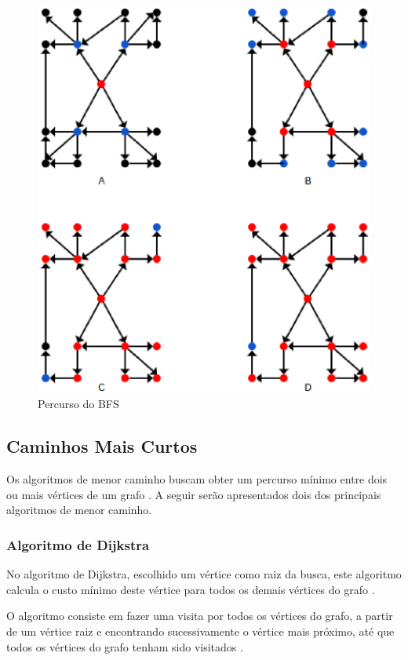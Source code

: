 \begin{figure}[!h]
	\centering
	\includegraphics[scale=0.5]{figuras/capitulo2/bfs.eps}
	\caption{Percurso do BFS}
	\label{bfs}
\end{figure}

\subsection{Caminhos Mais Curtos}

Os algoritmos de menor caminho buscam obter um percurso mínimo entre dois ou mais vértices de um grafo \cite{Cormen:2001}. A seguir serão apresentados dois dos principais algoritmos de menor caminho.

\subsubsection{Algoritmo de Dijkstra}

No algoritmo de Dijkstra, escolhido um vértice como raiz da busca, este algoritmo calcula o custo mínimo deste vértice para todos os demais vértices do grafo \cite{Cormen:2001}.

O algoritmo consiste em fazer uma visita por todos os vértices do grafo, a partir de um vértice raiz e encontrando sucessivamente o vértice mais próximo, até que todos os vértices do grafo tenham sido visitados \cite{Cormen:2001}.

